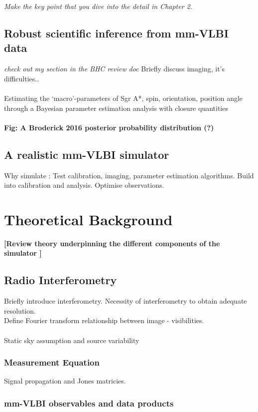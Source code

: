 \documentclass{article}
\begin{document}
{\it Make the key point that you dive into the detail in Chapter 2. }


\subsection{Robust scientific inference from mm-VLBI data}

{\it check out my section in the BHC review doc}
Briefly discuss imaging, it's difficulties..\\
~\\
Estimating the `macro'-parameters of Sgr A*, spin, orientation, position angle through a Bayesian parameter estimation analysis with closure quantities\\
~\\
\textbf{Fig: A Broderick 2016 posterior probability distribution (?)}\\


\subsection{A realistic mm-VLBI simulator}
Why simulate : Test calibration, imaging, parameter estimation algorithms. Build into calibration and analysis. Optimise observations.




\section{Theoretical Background}{\bf [Review theory underpinning the different components of the simulator ]}


\subsection{Radio Interferometry}
Briefly introduce interferometry. Necessity of interferometry to obtain adequate resolution. 
~\\
Define Fourier transform relationship between image - visibilities. \\
~\\
Static sky assumption and source variability
\subsubsection{Measurement Equation}
Signal propagation and Jones matricies.
	
\subsubsection{mm-VLBI observables and data products}
\end{document}
